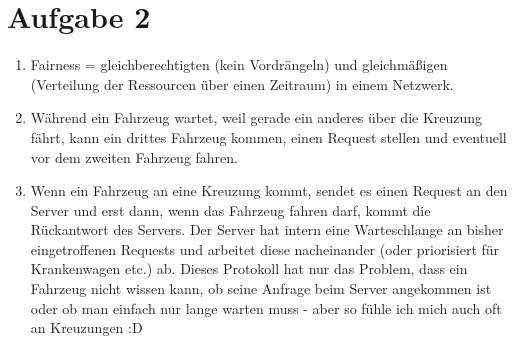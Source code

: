 \documentclass{article}
\begin{document}
	\section*{Aufgabe 2}
	\begin{enumerate}[label=(\alph*)]
		\item Fairness = gleichberechtigten (kein Vordrängeln) und gleichmäßigen (Verteilung der Ressourcen über einen Zeitraum) in einem Netzwerk.
		\item Während ein Fahrzeug wartet, weil gerade ein anderes über die Kreuzung fährt, kann ein drittes Fahrzeug kommen, einen Request stellen und eventuell vor dem zweiten Fahrzeug fahren.
		\item Wenn ein Fahrzeug an eine Kreuzung kommt, sendet es einen Request an den Server und erst dann, wenn das Fahrzeug fahren darf, kommt die Rückantwort des Servers. Der Server hat intern eine Warteschlange an bisher eingetroffenen Requests und arbeitet diese nacheinander (oder priorisiert für Krankenwagen etc.) ab. Dieses Protokoll hat nur das Problem, dass ein Fahrzeug nicht wissen kann, ob seine Anfrage beim Server angekommen ist oder ob man einfach nur lange warten muss - aber so fühle ich mich auch oft an Kreuzungen :D
	\end{enumerate}
\end{document}
